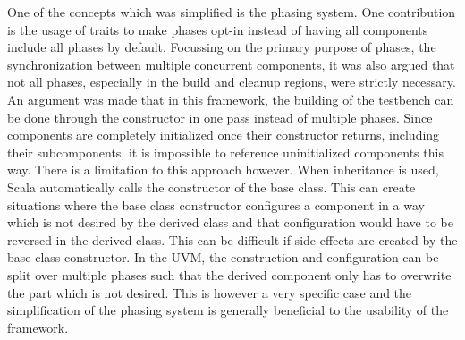 
One of the concepts which was simplified is the phasing system. One contribution is the usage of traits to make phases opt-in instead of having all components include all phases by default. Focussing on the primary purpose of phases, the synchronization between multiple concurrent components, it was also argued that not all phases, especially in the build and cleanup regions, were strictly necessary. An argument was made that in this framework, the building of the testbench can be done through the constructor in one pass instead of multiple phases. Since components are completely initialized once their constructor returns, including their subcomponents, it is impossible to reference uninitialized components this way. There is a limitation to this approach however. When inheritance is used, Scala automatically calls the constructor of the base class. This can create situations where the base class constructor configures a component in a way which is not desired by the derived class and that configuration would have to be reversed in the derived class. This can be difficult if side effects are created by the base class constructor. In the UVM, the construction and configuration can be split over multiple phases such that the derived component only has to overwrite the part which is not desired. This is however a very specific case and the simplification of the phasing system is generally beneficial to the usability of the framework. 

